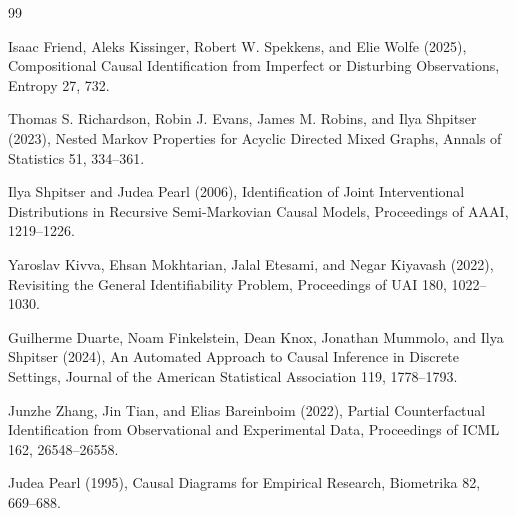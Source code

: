 \documentclass{article}
\begin{document}
\begin{thebibliography}{99}

   Isaac Friend, Aleks Kissinger, Robert W. Spekkens, and Elie Wolfe (2025), Compositional Causal Identification from Imperfect or Disturbing Observations, Entropy 27, 732.

   Thomas S. Richardson, Robin J. Evans, James M. Robins, and Ilya Shpitser (2023), Nested Markov Properties for Acyclic Directed Mixed Graphs, Annals of Statistics 51, 334--361.

   Ilya Shpitser and Judea Pearl (2006), Identification of Joint Interventional Distributions in Recursive Semi-Markovian Causal Models, Proceedings of AAAI, 1219--1226.

   Yaroslav Kivva, Ehsan Mokhtarian, Jalal Etesami, and Negar Kiyavash (2022), Revisiting the General Identifiability Problem, Proceedings of UAI 180, 1022--1030.

   Guilherme Duarte, Noam Finkelstein, Dean Knox, Jonathan Mummolo, and Ilya Shpitser (2024), An Automated Approach to Causal Inference in Discrete Settings, Journal of the American Statistical Association 119, 1778--1793.

   Junzhe Zhang, Jin Tian, and Elias Bareinboim (2022), Partial Counterfactual Identification from Observational and Experimental Data, Proceedings of ICML 162, 26548--26558.

   Judea Pearl (1995), Causal Diagrams for Empirical Research, Biometrika 82, 669--688.

\end{thebibliography}
\end{document}
